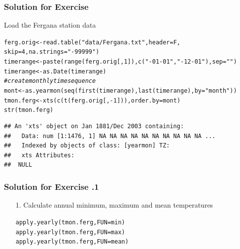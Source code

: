\documentclass[xcolor=table, xcolor=dvipsnames]{beamer}\usepackage[]{graphicx}\usepackage[]{color}
\makeatletter
\newcommand{\hlnum}[1]{\textcolor[rgb]{0,0,0}{#1}}
\newcommand{\hlstr}[1]{\textcolor[rgb]{0.545,0.137,0.137}{#1}}
\newcommand{\hlcom}[1]{\textcolor[rgb]{0,0.392,0}{\textit{#1}}}
\newcommand{\hlopt}[1]{\textcolor[rgb]{0,0,0}{#1}}
\newcommand{\hlstd}[1]{\textcolor[rgb]{0,0,0}{#1}}
\newcommand{\hlkwb}[1]{\textcolor[rgb]{0,0,0}{#1}}
\newcommand{\hlkwc}[1]{\textcolor[rgb]{1,0,1}{#1}}
\newcommand{\hlkwd}[1]{\textcolor[rgb]{0,0,1}{#1}}
\newenvironment{kframe}{%
 \def\at@end@of@kframe{}%
 \ifinner\ifhmode%
  \def\at@end@of@kframe{\end{minipage}}%
  \begin{minipage}{\columnwidth}%
 \fi\fi%
 \def\FrameCommand##1{\hskip\@totalleftmargin \hskip-\fboxsep
 \colorbox{shadecolor}{##1}\hskip-\fboxsep
     \hskip-\linewidth \hskip-\@totalleftmargin \hskip\columnwidth}%
 \MakeFramed {\advance\hsize-\width
   \@totalleftmargin\z@ \linewidth\hsize
   \@setminipage}}%
 {\par\unskip\endMakeFramed%
 \at@end@of@kframe}
\newenvironment{knitrout}{}{} %
\newcounter{exercisecount}
\makeatother
\begin{document}
\begin{frame}[fragile]\frametitle{Solution for Exercise }
Load the Fergana station data
\begin{knitrout}\footnotesize
{}\color{fgcolor}\begin{kframe}
\begin{alltt}
\hlstd{ferg.orig} \hlkwb{<-} \hlkwd{read.table}\hlstd{(}\hlstr{"data/Fergana.txt"}\hlstd{,} \hlkwc{header}\hlstd{=F,}
                       \hlkwc{skip}\hlstd{=}\hlnum{4}\hlstd{,} \hlkwc{na.strings}\hlstd{=}\hlstr{"-99999"}\hlstd{)}
\hlstd{timerange} \hlkwb{<-} \hlkwd{paste}\hlstd{(}\hlkwd{range}\hlstd{(ferg.orig[,}\hlnum{1}\hlstd{]),} \hlkwd{c}\hlstd{(}\hlstr{"-01-01"}\hlstd{,} \hlstr{"-12-01"}\hlstd{),} \hlkwc{sep}\hlstd{=}\hlstr{""}\hlstd{)}
\hlstd{timerange} \hlkwb{<-} \hlkwd{as.Date}\hlstd{(timerange)}
\hlcom{# create monthly time sequence}
\hlstd{mont} \hlkwb{<-} \hlkwd{as.yearmon}\hlstd{(}\hlkwd{seq}\hlstd{(}\hlkwd{first}\hlstd{(timerange),} \hlkwd{last}\hlstd{(timerange),} \hlkwc{by}\hlstd{=}\hlstr{"month"}\hlstd{))}
\hlstd{tmon.ferg} \hlkwb{<-} \hlkwd{xts}\hlstd{(}\hlkwd{c}\hlstd{(}\hlkwd{t}\hlstd{(ferg.orig[,}\hlopt{-}\hlnum{1}\hlstd{])),} \hlkwc{order.by}\hlstd{=mont)}
\hlkwd{str}\hlstd{(tmon.ferg)}
\end{alltt}
\begin{verbatim}
## An 'xts' object on Jan 1881/Dec 2003 containing:
##   Data: num [1:1476, 1] NA NA NA NA NA NA NA NA NA NA ...
##   Indexed by objects of class: [yearmon] TZ: 
##   xts Attributes:  
##  NULL
\end{verbatim}
\end{kframe}
\end{knitrout}
\end{frame}
  

\begin{frame}[fragile]\frametitle{Solution for Exercise .1}
  \begin{enumerate}
  \item[1.] Calculate annual minimum, maximum and mean temperatures
\begin{knitrout}
\color{fgcolor}\begin{kframe}
\begin{alltt}
\hlkwd{apply.yearly}\hlstd{(tmon.ferg,} \hlkwc{FUN}\hlstd{=min)}
\hlkwd{apply.yearly}\hlstd{(tmon.ferg,} \hlkwc{FUN}\hlstd{=max)}
\hlkwd{apply.yearly}\hlstd{(tmon.ferg,} \hlkwc{FUN}\hlstd{=mean)}
\end{alltt}
\end{kframe}
\end{knitrout}
  \end{enumerate}
\end{frame}
\end{document}
